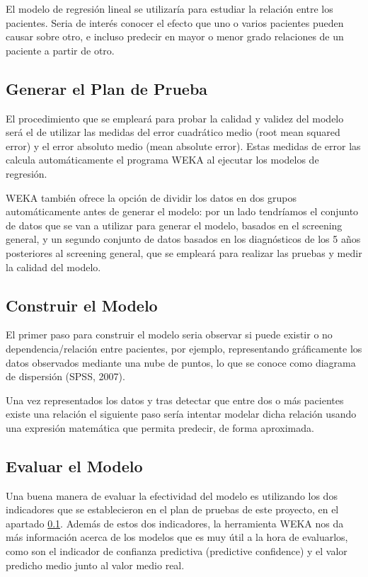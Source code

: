 \documentclass{article}
\begin{document}
El modelo de regresión lineal se utilizaría para estudiar la relación entre los pacientes. Seria de interés conocer el efecto que uno o varios pacientes pueden causar sobre otro, e incluso predecir en mayor o menor grado relaciones de un paciente a partir de otro.

\subsection{Generar el Plan de Prueba}\label{Plan de Prueba}
El procedimiento que se empleará para probar la calidad y validez del modelo será el de utilizar las medidas del error cuadrático medio (root mean squared error) y el error absoluto medio (mean absolute error). Estas medidas de error las calcula automáticamente el programa WEKA al ejecutar los modelos de regresión.

WEKA también ofrece la opción de dividir los datos en dos grupos automáticamente antes de generar el modelo: por un lado tendríamos el conjunto de datos que se van a utilizar para generar el modelo, basados en el screening general, y un segundo conjunto de datos basados en los diagnósticos de los 5 años posteriores al screening general, que se empleará para realizar las pruebas y medir la calidad del modelo. 

\subsection{Construir el Modelo}
El primer paso para construir el modelo seria observar si puede existir o no dependencia/relación entre pacientes, por ejemplo, representando gráficamente los datos observados mediante una nube de puntos, lo que se conoce como diagrama de dispersión (SPSS, 2007).

Una vez representados los datos y tras detectar que entre dos o más pacientes existe una relación el siguiente paso sería intentar modelar dicha relación usando una expresión matemática que permita predecir, de forma aproximada.  

\subsection{Evaluar el Modelo}
Una buena manera de evaluar la efectividad del modelo es utilizando los dos indicadores que se establecieron en el plan de pruebas de este proyecto, en el apartado \ref{Plan de Prueba}. Además de estos dos indicadores, la herramienta WEKA nos da más información acerca de los modelos que es muy útil a la hora de evaluarlos, como son el indicador de confianza predictiva (predictive confidence) y el valor predicho medio junto al valor medio real.
\end{document}
